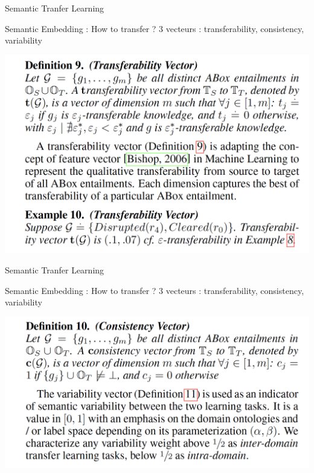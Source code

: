 \documentclass{beamer}
\begin{document}
\begin{frame}{Semantic Tranfer Learning}
\begin{block}{Semantic  Embedding : How to transfer ? }
3 vecteurs : transferability, consistency, variability

 \centering
    \includegraphics[scale=0.4]{Figures/tv.png}
\end{block}
\end{frame}

\begin{frame}{Semantic Tranfer Learning}
\begin{block}{Semantic  Embedding : How to transfer ? }
3 vecteurs : transferability, consistency, variability

 \centering
    \includegraphics[scale=0.4]{Figures/cv.png}
\end{block}
\end{frame}
\end{document}
